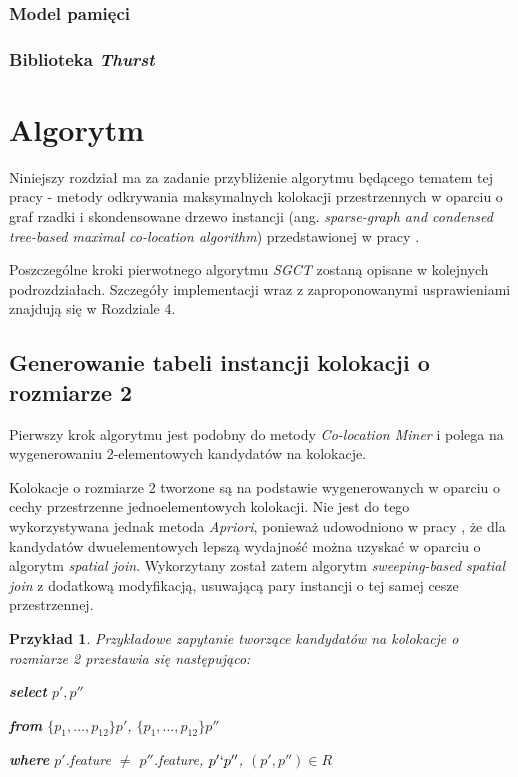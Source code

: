 \documentclass[12pt]{article}
\newtheorem{sample}{Przykład}
\begin{document}
\subsubsection{Model pamięci}

\subsubsection{Biblioteka \textit{Thurst}}

\newpage

\section{Algorytm}

Niniejszy rozdział ma za zadanie przybliżenie algorytmu będącego tematem tej pracy - metody odkrywania maksymalnych kolokacji przestrzennych w oparciu o graf rzadki i skondensowane drzewo instancji (ang. \textit{sparse-graph and condensed tree-based maximal co-location algorithm}) przedstawionej w pracy \cite{chinczyki}. 

Poszczególne kroki pierwotnego algorytmu \textit{SGCT} zostaną opisane w kolejnych podrozdziałach. Szczegóły implementacji wraz z zaproponowanymi usprawieniami znajdują się w Rozdziale 4.

\subsection{Generowanie tabeli instancji kolokacji o rozmiarze 2}

Pierwszy krok algorytmu jest podobny do metody \textit{Co-location Miner} i polega na wygenerowaniu 2-elementowych kandydatów na kolokacje. 

Kolokacje o rozmiarze 2 tworzone są na podstawie wygenerowanych w oparciu o cechy przestrzenne jednoelementowych kolokacji. Nie jest do tego wykorzystywana jednak metoda \textit{Apriori}, ponieważ udowodniono w pracy \cite{huang}, że dla kandydatów dwuelementowych lepszą wydajność można uzyskać w oparciu o algorytm \textit{spatial join}. Wykorzytany został zatem algorytm \textit{sweeping-based spatial join} \cite{spatial} z dodatkową modyfikacją, usuwającą pary instancji o tej samej cesze przestrzennej. 

\begin{sample}Przykładowe zapytanie tworzące kandydatów na kolokacje o rozmiarze 2 przestawia się następująco:

\textbf{select} $ p', p''$

\textbf{from} $ \{p_{1},...,p_{12}\} p' $, $ \{p_{1},...,p_{12}\} p''$

\textbf{where}  $ p' $.feature $ \neq $ $ p'' $.feature, $ p' \lq p'' $, $(p', p'') \in R$
\end{sample}
\end{document}
